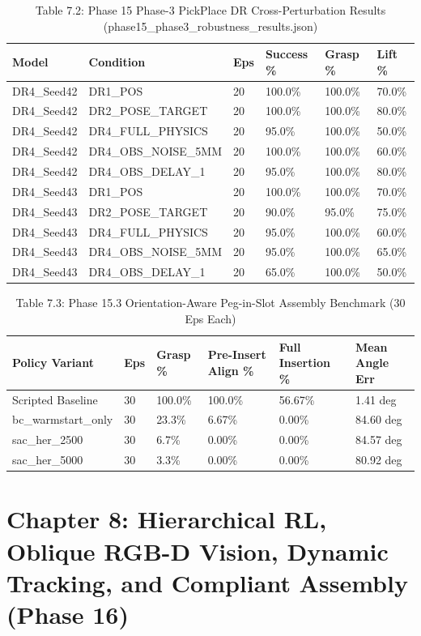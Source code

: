 \documentclass[11pt,a4paper,oneside]{book}
\begin{document}
\begin{longtable}{l l l l l l}\caption{Table 7.2: Phase 15 Phase-3 PickPlace DR Cross-Perturbation Results (phase15\_phase3\_robustness\_results.json)}\\\toprule
Model & Condition & Eps & Success \% & Grasp \% & Lift \% \\ \midrule \endhead
DR4\_Seed42 & DR1\_POS & 20 & 100.0\% & 100.0\% & 70.0\% \\
DR4\_Seed42 & DR2\_POSE\_TARGET & 20 & 100.0\% & 100.0\% & 80.0\% \\
DR4\_Seed42 & DR4\_FULL\_PHYSICS & 20 & 95.0\% & 100.0\% & 50.0\% \\
DR4\_Seed42 & DR4\_OBS\_NOISE\_5MM & 20 & 100.0\% & 100.0\% & 60.0\% \\
DR4\_Seed42 & DR4\_OBS\_DELAY\_1 & 20 & 95.0\% & 100.0\% & 80.0\% \\
DR4\_Seed43 & DR1\_POS & 20 & 100.0\% & 100.0\% & 70.0\% \\
DR4\_Seed43 & DR2\_POSE\_TARGET & 20 & 90.0\% & 95.0\% & 75.0\% \\
DR4\_Seed43 & DR4\_FULL\_PHYSICS & 20 & 95.0\% & 100.0\% & 60.0\% \\
DR4\_Seed43 & DR4\_OBS\_NOISE\_5MM & 20 & 95.0\% & 100.0\% & 65.0\% \\
DR4\_Seed43 & DR4\_OBS\_DELAY\_1 & 20 & 65.0\% & 100.0\% & 50.0\% \\
\bottomrule \end{longtable}
\begin{longtable}{l l l l l l}\caption{Table 7.3: Phase 15.3 Orientation-Aware Peg-in-Slot Assembly Benchmark (30 Eps Each)}\\\toprule
Policy Variant & Eps & Grasp \% & Pre-Insert Align \% & Full Insertion \% & Mean Angle Err \\ \midrule \endhead
Scripted Baseline & 30 & 100.0\% & 100.0\% & 56.67\% & 1.41 deg \\
bc\_warmstart\_only & 30 & 23.3\% & 6.67\% & 0.00\% & 84.60 deg \\
sac\_her\_2500 & 30 & 6.7\% & 0.00\% & 0.00\% & 84.57 deg \\
sac\_her\_5000 & 30 & 3.3\% & 0.00\% & 0.00\% & 80.92 deg \\
\bottomrule \end{longtable}
\chapter{Chapter 8: Hierarchical RL, Oblique RGB-D Vision, Dynamic Tracking, and Compliant Assembly (Phase 16)}
\end{document}
